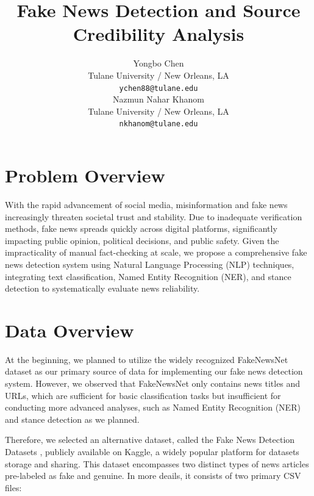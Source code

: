 \documentclass[11pt,a4paper]{article}
\title{Fake News Detection and Source Credibility Analysis}
\author{Yongbo Chen \\
  Tulane University / New Orleans, LA \\
  \texttt{ychen88@tulane.edu} \\\And
  Nazmun Nahar Khanom \\
  Tulane University / New Orleans, LA \\
  \texttt{nkhanom@tulane.edu} \\}
\date{}
\begin{document}
\maketitle


\section{Problem Overview}

With the rapid advancement of social media, misinformation and fake news increasingly threaten societal trust and stability. 
Due to inadequate verification methods, fake news spreads quickly across digital platforms, significantly impacting public opinion, political decisions, and public safety. 
Given the impracticality of manual fact-checking at scale, we propose a comprehensive fake news detection system using Natural Language Processing (NLP) techniques, 
integrating text classification, Named Entity Recognition (NER), and stance detection to systematically evaluate news reliability.

\section{Data Overview}

At the beginning, we planned to utilize the widely recognized FakeNewsNet dataset \cite{shu2018fakenewsnet, shu2017fake, shu2017exploiting} as our primary source of data for implementing our fake news detection system. However, we observed that FakeNewsNet only contains news titles and URLs, which are sufficient for basic classification tasks but insufficient for conducting more advanced analyses, such as Named Entity Recognition (NER) and stance detection as we planned.

Therefore, we selected an alternative dataset, called the Fake News Detection Datasets \cite{ahmed2018detecting, ahmed2017detection}, publicly available on Kaggle, a widely popular platform for datasets storage and sharing. This dataset encompasses two distinct types of news articles pre-labeled as fake and genuine. In more deails, it consists of two primary CSV files:
\end{document}
